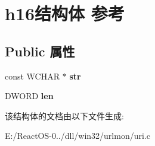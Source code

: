 \hypertarget{structh16}{}\section{h16结构体 参考}
\label{structh16}
\subsection*{Public 属性}
\begin{DoxyCompactItemize}
\item 
\mbox{\label{structh16_ab6f29b118dbab2f170a4184c0df48d52}} 
const W\+C\+H\+AR $\ast$ {\bfseries str}
\item 
\mbox{\label{structh16_a5c5cc4843b2929a3fd22fcd28e656889}} 
D\+W\+O\+RD {\bfseries len}
\end{DoxyCompactItemize}


该结构体的文档由以下文件生成\+:\begin{DoxyCompactItemize}
\item 
E\+:/\+React\+O\+S-\/0../dll/win32/urlmon/uri.\+c\end{DoxyCompactItemize}
